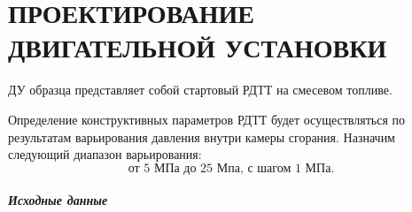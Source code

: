 \chapter{ПРОЕКТИРОВАНИЕ \\ДВИГАТЕЛЬНОЙ УСТАНОВКИ}
\label{chapter:appendix_rdtt}
ДУ образца представляет собой стартовый РДТТ на смесевом топливе.

Определение конструктивных параметров РДТТ будет осуществляться по результатам варьирования давления внутри камеры сгорания. Назначим следующий диапазон варьирования:
\[ \text{от 5 МПа до 25 Мпа, с шагом 1 МПа.}
\]

\paragraph{Исходные данные}

